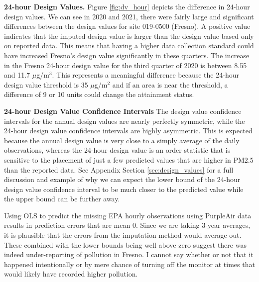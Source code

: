 \documentclass[12pt]{article}
\begin{document}
\noindent\textbf{24-hour Design Values.} Figure \ref{fig:dv_hour} depicts the difference in 24-hour design values. We can see in 2020 and 2021, there were fairly large and significant differences between the design values for site 019-0500 (Fresno). A positive value indicates that the imputed design value is larger than the design value based only on reported data. This means that having a higher data collection standard could have increased Fresno's design value significantly in these quarters. The increase in the Fresno 24-hour design value for the third quarter of 2020 is between 8.55 and 11.7 $\mu$g/m$^3$. This represents a meaningful difference because the 24-hour design value threshold is 35 $\mu$g/m$^2$ and if an area is near the threshold, a difference of 9 or 10 units could change the attainment status.


\noindent\textbf{24-hour Design Value Confidence Intervals}
The design value confidence intervals for the annual design values are nearly perfectly symmetric, while the 24-hour design value confidence intervals are highly asymmetric. This is expected because the annual design value is very close to a simply average of the daily observations, whereas the 24-hour design value is an order statistic that is sensitive to the placement of just a few predicted values that are higher in PM2.5 than the reported data. See Appendix Section \ref{sec:design_values} for a full discussion and example of why we can expect the lower bound of the 24-hour design value confidence interval to be much closer to the predicted value while the upper bound can be further away.

Using OLS to predict the missing EPA hourly observations using PurpleAir data results in prediction errors that are mean 0. Since we are taking 3-year averages, it is plausible that the errors from the imputation method would average out. These combined with the lower bounds being well above zero suggest there was indeed under-reporting of pollution in Fresno. I cannot say whether or not that it happened intentionally or by mere chance of turning off the monitor at times that would likely have recorded higher pollution.
\end{document}
